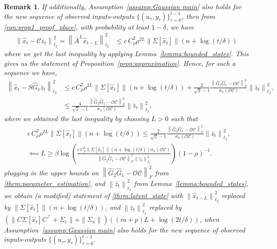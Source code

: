 \documentclass[11pt]{article}
\newtheorem{remark}{Remark}
\newcommand{\Abar}{\bar{A}}
\newcommand{\zbar}{\bar{z}}
\newcommand{\xtil}{\hat{x}}
\newcommand{\Ccal}{\mathcal{C}}
\newcommand{\Ocal}{\mathcal{O}}
\newcommand{\tn}[1]{\left\|{#1}\right\|_{\ell_2}}
\newcommand{\nn}{\nonumber}
\newcommand{\tf}[1]{\left\|{#1}\right\|_{F}}
\newcommand{\norm}[1]{\|{#1} \|}
\newcommand{\T}{\top}
\newcommand{\fronorm}[1]{\left\|#1\right\|_{F}}
\newcommand{\<}{\langle}
\renewcommand{\>}{\rangle}
\numberwithin{equation}{section}
\begin{document}
\begin{remark}
	If additionally, Assumption~\ref{assump:Gaussian main} also holds for the new sequence of observed inputs-outputs $\{(u_\tau,y_\tau)\}_{\tau = 0}^{t-1}$, then from \eqref{eqn:prop1_proof_place}, with probability at least $1-\delta$, we have
	\begin{align}
		\tn{\xtil_t - \Ccal\zbar_t}^2 = \tn{\Abar^L \xtil_{t-L}}^2 %
		& \leq c\,C_{\rho}^2 \rho^{2L}\norm{\Sigma[\xtil_t]} \left(n + \log (t/\delta)\right)
	\end{align}
	where we get the last inequality by applying Lemma~\ref{lemma:bounded_states}. This gives us the statement of Proposition~\ref{prop:approximation}. Hence, for such a sequence we have,
	\begin{align}
		\tn{\xtil_t - S \hat{G}_1 \zbar_{t}}^2 %
		& \leq c\,C_{\rho}^2 \rho^{2L}\norm{\Sigma[\xtil_t]} \left(n + \log (t/\delta)\right) +\frac{2}{\sqrt{2} - 1} \frac{\fronorm{\hat{G}_2 \hat{G}_1 - \Ocal \Ccal}^2}{\sigma_{n}\left(\Ocal \Ccal\right)}\tn{\zbar_t}^2, \nn \\
		&\leq \frac{4}{\sqrt{2} - 1} \frac{\fronorm{\hat{G}_2 \hat{G}_1 - \Ocal \Ccal}^2}{\sigma_{n}\left(\Ocal \Ccal\right)}\tn{\zbar_t}^2,
	\end{align}
	where we obtained the last inequality by choosing $L >0$ such that
	\begin{align*}
		& c\,C_{\rho}^2 \rho^{2L}\norm{\Sigma[\xtil_t]} \left(n + \log (t/\delta)\right) \leq \frac{2}{\sqrt{2} - 1} \frac{\fronorm{\hat{G}_2 \hat{G}_1 - \Ocal \Ccal}^2}{\sigma_{n}\left(\Ocal \Ccal\right)}\tn{\zbar_t}^2, \nn \\
		&\impliedby L  \geq \beta\log \left(\frac{c\,C_{\rho}^2\norm{\Sigma[\xtil_t]} \left(n + \log (t/\delta)\right) \sigma_{n}\left(\Ocal \Ccal\right)}{\fronorm{\hat{G}_2 \hat{G}_1 - \Ocal \Ccal}^2\tn{\zbar_t}^2}\right)(1-\rho)^{-1}.
	\end{align*}
	plugging in the upper bounds on $\fronorm{\hat{G}_2 \hat{G}_1 - \Ocal \Ccal}^2$ from \ref{thrm:parameter_estimation}, and $\tn{\zbar_t}^2$ from Lemma~\ref{lemma:bounded_states}, we obtain (a modified) statement of \ref{thrm:latent_state} with $\tn{\xtil_{t-L}}^2$ replaced by $\norm{\Sigma[\xtil_t]} \left(n + \log (t/\delta)\right)$, and $\tn{\zbar_t}^2$ replaced by $(\norm{C\Sigma[\xtil_t]C^\T + \Sigma_e} + \norm{\Sigma_u}) \left( (m+p)L + \log (2t/\delta)\right)$, when Assumption~\ref{assump:Gaussian main} also holds for the new sequence of observed inputs-outputs $\{(u_\tau,y_\tau)\}_{\tau = 0}^{t-1}$.
\end{remark}
\end{document}
